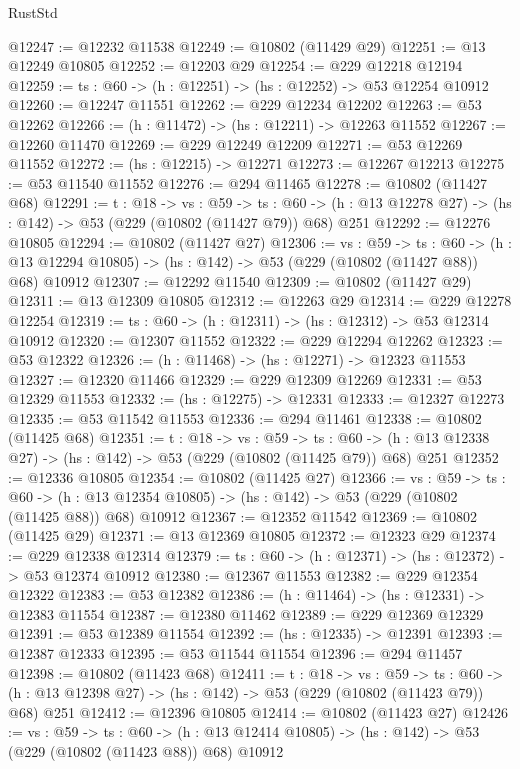 \begin{lexlean}{RustStd}
\begin{coremodule}
@12247 := @12232 @11538
@12249 := @10802 (@11429 @29)
@12251 := @13 @12249 @10805
@12252 := @12203 @29
@12254 := @229 @12218 @12194
@12259 := {ts : @60} -> (h : @12251) -> (hs : @12252) -> @53 @12254 @10912
@12260 := @12247 @11551
@12262 := @229 @12234 @12202
@12263 := @53 @12262
@12266 := (h : @11472) -> (hs : @12211) -> @12263 @11552
@12267 := @12260 @11470
@12269 := @229 @12249 @12209
@12271 := @53 @12269 @11552
@12272 := (hs : @12215) -> @12271
@12273 := @12267 @12213
@12275 := @53 @11540 @11552
@12276 := @294 @11465
@12278 := @10802 (@11427 @68)
@12291 := {t : @18} ->
  {vs : @59} ->
  {ts : @60} -> (h : @13 @12278 @27) -> (hs : @142) -> @53 (@229 (@10802 (@11427 @79)) @68) @251
@12292 := @12276 @10805
@12294 := @10802 (@11427 @27)
@12306 := {vs : @59} ->
  {ts : @60} ->
  (h : @13 @12294 @10805) -> (hs : @142) -> @53 (@229 (@10802 (@11427 @88)) @68) @10912
@12307 := @12292 @11540
@12309 := @10802 (@11427 @29)
@12311 := @13 @12309 @10805
@12312 := @12263 @29
@12314 := @229 @12278 @12254
@12319 := {ts : @60} -> (h : @12311) -> (hs : @12312) -> @53 @12314 @10912
@12320 := @12307 @11552
@12322 := @229 @12294 @12262
@12323 := @53 @12322
@12326 := (h : @11468) -> (hs : @12271) -> @12323 @11553
@12327 := @12320 @11466
@12329 := @229 @12309 @12269
@12331 := @53 @12329 @11553
@12332 := (hs : @12275) -> @12331
@12333 := @12327 @12273
@12335 := @53 @11542 @11553
@12336 := @294 @11461
@12338 := @10802 (@11425 @68)
@12351 := {t : @18} ->
  {vs : @59} ->
  {ts : @60} -> (h : @13 @12338 @27) -> (hs : @142) -> @53 (@229 (@10802 (@11425 @79)) @68) @251
@12352 := @12336 @10805
@12354 := @10802 (@11425 @27)
@12366 := {vs : @59} ->
  {ts : @60} ->
  (h : @13 @12354 @10805) -> (hs : @142) -> @53 (@229 (@10802 (@11425 @88)) @68) @10912
@12367 := @12352 @11542
@12369 := @10802 (@11425 @29)
@12371 := @13 @12369 @10805
@12372 := @12323 @29
@12374 := @229 @12338 @12314
@12379 := {ts : @60} -> (h : @12371) -> (hs : @12372) -> @53 @12374 @10912
@12380 := @12367 @11553
@12382 := @229 @12354 @12322
@12383 := @53 @12382
@12386 := (h : @11464) -> (hs : @12331) -> @12383 @11554
@12387 := @12380 @11462
@12389 := @229 @12369 @12329
@12391 := @53 @12389 @11554
@12392 := (hs : @12335) -> @12391
@12393 := @12387 @12333
@12395 := @53 @11544 @11554
@12396 := @294 @11457
@12398 := @10802 (@11423 @68)
@12411 := {t : @18} ->
  {vs : @59} ->
  {ts : @60} -> (h : @13 @12398 @27) -> (hs : @142) -> @53 (@229 (@10802 (@11423 @79)) @68) @251
@12412 := @12396 @10805
@12414 := @10802 (@11423 @27)
@12426 := {vs : @59} ->
  {ts : @60} ->
  (h : @13 @12414 @10805) -> (hs : @142) -> @53 (@229 (@10802 (@11423 @88)) @68) @10912

\end{coremodule}
\end{lexlean}
